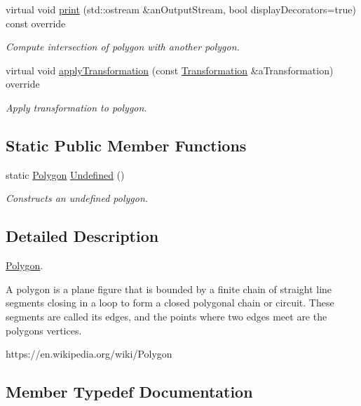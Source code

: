\begin{DoxyCompactItemize}
virtual void \hyperlink{classostk_1_1math_1_1geom_1_1d3_1_1objects_1_1_polygon_abe478a380cdd22efb082590fda923201}{print} (std\+::ostream \&an\+Output\+Stream, bool display\+Decorators=true) const override
\begin{DoxyCompactList}\small\item\em Compute intersection of polygon with another polygon. \end{DoxyCompactList}\item 
virtual void \hyperlink{classostk_1_1math_1_1geom_1_1d3_1_1objects_1_1_polygon_abf60fe8602485822f8f07c01f6980cf5}{apply\+Transformation} (const \hyperlink{classostk_1_1math_1_1geom_1_1d3_1_1_transformation}{Transformation} \&a\+Transformation) override
\begin{DoxyCompactList}\small\item\em Apply transformation to polygon. \end{DoxyCompactList}\end{DoxyCompactItemize}
\subsection*{Static Public Member Functions}
\begin{DoxyCompactItemize}
\item 
static \hyperlink{classostk_1_1math_1_1geom_1_1d3_1_1objects_1_1_polygon}{Polygon} \hyperlink{classostk_1_1math_1_1geom_1_1d3_1_1objects_1_1_polygon_ae8e72528e193664f1466ba7e6e3e18ae}{Undefined} ()
\begin{DoxyCompactList}\small\item\em Constructs an undefined polygon. \end{DoxyCompactList}\end{DoxyCompactItemize}


\subsection{Detailed Description}
\hyperlink{classostk_1_1math_1_1geom_1_1d3_1_1objects_1_1_polygon}{Polygon}. 

A polygon is a plane figure that is bounded by a finite chain of straight line segments closing in a loop to form a closed polygonal chain or circuit. These segments are called its edges, and the points where two edges meet are the polygon\textquotesingle{}s vertices.

https\+://en.wikipedia.\+org/wiki/\+Polygon 

\subsection{Member Typedef Documentation}
\mbox{\label{classostk_1_1math_1_1geom_1_1d3_1_1objects_1_1_polygon_a58c9a7e93e903b2226804116cce4f1ec}} 
